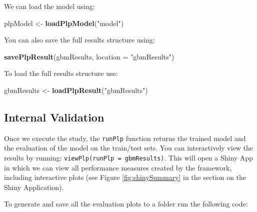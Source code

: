 \documentclass[11pt]{book}
\newenvironment{Shaded}{\begin{snugshade}}{\end{snugshade}}
\newcommand{\DataTypeTok}[1]{\textcolor[rgb]{0.13,0.29,0.53}{#1}}
\newcommand{\KeywordTok}[1]{\textcolor[rgb]{0.13,0.29,0.53}{\textbf{#1}}}
\newcommand{\NormalTok}[1]{#1}
\newcommand{\OperatorTok}[1]{\textcolor[rgb]{0.81,0.36,0.00}{\textbf{#1}}}
\newcommand{\StringTok}[1]{\textcolor[rgb]{0.31,0.60,0.02}{#1}}
\theoremstyle{definition}
\theoremstyle{definition}
\theoremstyle{definition}
\theoremstyle{remark}
\begin{document}
\begin{Shaded}
\end{Shaded}

We can load the model using:

\begin{Shaded}
\begin{Highlighting}[]
\NormalTok{plpModel <-}\StringTok{ }\KeywordTok{loadPlpModel}\NormalTok{(}\StringTok{"model"}\NormalTok{)}
\end{Highlighting}
\end{Shaded}

You can also save the full results structure using:

\begin{Shaded}
\begin{Highlighting}[]
\KeywordTok{savePlpResult}\NormalTok{(gbmResults, }\DataTypeTok{location =} \StringTok{"gbmResults"}\NormalTok{)}
\end{Highlighting}
\end{Shaded}

To load the full results structure use:

\begin{Shaded}
\begin{Highlighting}[]
\NormalTok{gbmResults <-}\StringTok{ }\KeywordTok{loadPlpResult}\NormalTok{(}\StringTok{"gbmResults"}\NormalTok{)}
\end{Highlighting}
\end{Shaded}

\hypertarget{internal-validation}{%
\subsection{Internal Validation}\label{internal-validation}}

Once we execute the study, the \texttt{runPlp} function returns the trained model and the evaluation of the model on the train/test sets. You can interactively view the results by running: \texttt{viewPlp(runPlp\ =\ gbmResults)}. This will open a Shiny App in which we can view all performance measures created by the framework, including interactive plots (see Figure \ref{fig:shinySummary} in the section on the Shiny Application).

To generate and save all the evaluation plots to a folder run the following code:
\end{document}
